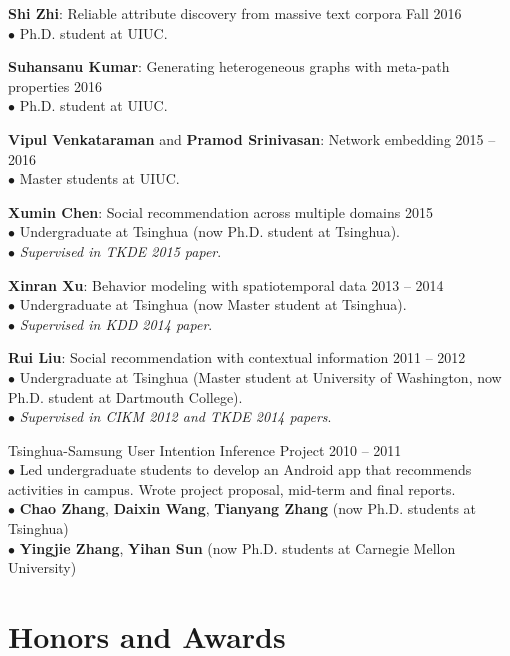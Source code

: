 \documentclass[margin, 10pt]{res}
\begin{document}
\begin{resume}
{\textbf{Shi Zhi}: Reliable attribute discovery from massive text corpora} \hfill{Fall 2016} \\
$\bullet$ Ph.D. student at UIUC.

{\textbf{Suhansanu Kumar}: Generating heterogeneous graphs with meta-path properties} \hfill{2016} \\
$\bullet$ Ph.D. student at UIUC.

{\textbf{Vipul Venkataraman} and \textbf{Pramod Srinivasan}: Network embedding} \hfill{2015 -- 2016} \\
$\bullet$ Master students at UIUC.

{\textbf{Xumin Chen}: Social recommendation across multiple domains} \hfill{2015} \\
$\bullet$ Undergraduate at Tsinghua (now Ph.D. student at Tsinghua). \\
$\bullet$ \textit{Supervised in TKDE 2015 paper}.

{\textbf{Xinran Xu}: Behavior modeling with spatiotemporal data} \hfill{2013 -- 2014} \\
$\bullet$ Undergraduate at Tsinghua (now Master student at Tsinghua). \\
$\bullet$ \textit{Supervised in KDD 2014 paper}.

{\textbf{Rui Liu}: Social recommendation with contextual information} \hfill{2011 -- 2012} \\
$\bullet$ Undergraduate at Tsinghua (Master student at University of Washington, now Ph.D. student at Dartmouth College). \\
$\bullet$ \textit{Supervised in CIKM 2012 and TKDE 2014 papers}.

Tsinghua-Samsung User Intention Inference Project \hfill{2010 -- 2011} \\
$\bullet$ Led undergraduate students to develop an Android app that recommends activities in campus. Wrote project proposal, mid-term and final reports. \\
$\bullet$ \textbf{Chao Zhang}, \textbf{Daixin Wang}, \textbf{Tianyang Zhang} (now Ph.D. students at Tsinghua) \\
$\bullet$ \textbf{Yingjie Zhang}, \textbf{Yihan Sun} (now Ph.D. students at Carnegie Mellon University)


\section{Honors and Awards}


\end{resume}
\end{document}
